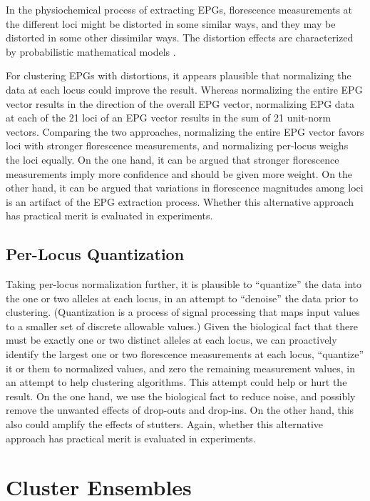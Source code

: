 In the physiochemical process of extracting EPGs, florescence measurements at the different loci might be distorted in some similar ways, and they may be distorted in some other dissimilar ways. The distortion effects are characterized by probabilistic mathematical models \cite{duffy_exploring_2017}.

For clustering EPGs with distortions, it appears plausible that normalizing the data at each locus could improve the result. Whereas normalizing the entire EPG vector results in the direction of the overall EPG vector, normalizing EPG data at each of the 21 loci of an EPG vector results in the sum of 21 unit-norm vectors. Comparing the two approaches, normalizing the entire EPG vector favors loci with stronger florescence measurements, and normalizing per-locus weighs the loci equally. On the one hand, it can be argued that stronger florescence measurements imply more confidence and should be given more weight. On the other hand, it can be argued that variations in florescence magnitudes among loci is an artifact of the EPG extraction process. Whether this alternative approach has practical merit is evaluated in experiments.

\subsection{Per-Locus Quantization}

Taking per-locus normalization further, it is plausible to ``quantize'' the data into the one or two alleles at each locus, in an attempt to ``denoise'' the data prior to clustering. (Quantization is a process of signal processing that maps input values to a smaller set of discrete allowable values.) Given the biological fact that there must be exactly one or two distinct alleles at each locus, we can proactively identify the largest one or two florescence measurements at each locus, ``quantize'' it or them to normalized values, and zero the remaining measurement values, in an attempt to help clustering algorithms. This attempt could help or hurt the result. On the one hand, we use the biological fact to reduce noise, and possibly remove the unwanted effects of drop-outs and drop-ins. On the other hand, this also could amplify the effects of stutters. Again, whether this alternative approach has practical merit is evaluated in experiments.

\section{Cluster Ensembles}

